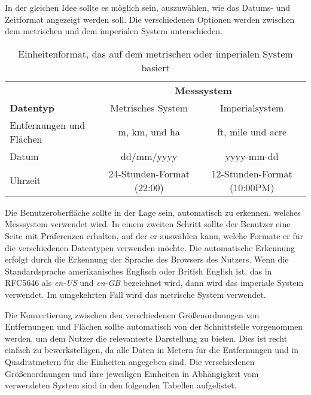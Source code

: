 In der gleichen Idee sollte es möglich sein, auszuwählen, wie das Datums- und Zeitformat angezeigt werden soll.
Die verschiedenen Optionen werden zwischen dem metrischen und dem imperialen System unterschieden.

\begin{table}[H]
  \centering
  \begin{tabular}{l c c}
    \toprule %
                             & \multicolumn{2}{c}{\textbf{Messsystem}}                               \\
    \cmidrule(l){2-3}
    \textbf{Datentyp}        & Metrisches System                       & Imperialsystem              \\
    \midrule %
    Entfernungen und Flächen & m, km, und ha                           & ft, mile und acre           \\
    Datum                    & dd/mm/yyyy                              & yyyy-mm-dd                  \\
    Uhrzeit                  & 24-Stunden-Format (22:00)               & 12-Stunden-Format (10:00PM) \\
  \end{tabular}
  \caption{Einheitenformat, das auf dem metrischen oder imperialen System basiert}
\end{table}

Die Benutzeroberfläche sollte in der Lage sein, automatisch zu erkennen, welches Messsystem verwendet wird.
In einem zweiten Schritt sollte der Benutzer eine Seite mit Präferenzen erhalten, auf der er auswählen kann, welche Formate er für die verschiedenen Datentypen verwenden möchte.
Die automatische Erkennung erfolgt durch die Erkennung der Sprache des Browsers des Nutzers.
Wenn die Standardsprache amerikanisches Englisch oder British English ist, das in RFC5646 \cite{rfc5646} als \textit{en-US} und \textit{en-GB} bezeichnet wird, dann wird das imperiale System verwendet.
Im umgekehrten Fall wird das metrische System verwendet.

Die Konvertierung zwischen den verschiedenen Größenordnungen von Entfernungen und Flächen sollte automatisch von der Schnittstelle vorgenommen werden, um dem Nutzer die relevanteste Darstellung zu bieten.
Dies ist recht einfach zu bewerkstelligen, da alle Daten in Metern für die Entfernungen und in Quadratmetern für die Einheiten angegeben sind.
Die verschiedenen Größenordnungen und ihre jeweiligen Einheiten in Abhängigkeit vom verwendeten System sind in den folgenden Tabellen aufgelistet.

